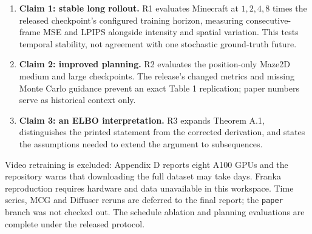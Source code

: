 \begin{enumerate}
\item \textbf{Claim 1: stable long rollout.} R1 evaluates Minecraft at $1,2,4,8$ times the released checkpoint's configured training horizon, measuring consecutive-frame MSE and LPIPS alongside intensity and spatial variation. This tests temporal stability, not agreement with one stochastic ground-truth future.
\item \textbf{Claim 2: improved planning.} R2 evaluates the position-only Maze2D medium and large checkpoints. The release's changed metrics and missing Monte Carlo guidance prevent an exact Table 1 replication; paper numbers serve as historical context only.
\item \textbf{Claim 3: an ELBO interpretation.} R3 expands Theorem A.1, distinguishes the printed statement from the corrected derivation, and states the assumptions needed to extend the argument to subsequences.
\end{enumerate}
Video retraining is excluded: Appendix D reports eight A100 GPUs and the repository warns that downloading the full dataset may take days. Franka reproduction requires hardware and data unavailable in this workspace. Time series, MCG and Diffuser reruns are deferred to the final report; the \texttt{paper} branch was not checked out. The schedule ablation and planning evaluations are complete under the released protocol.
